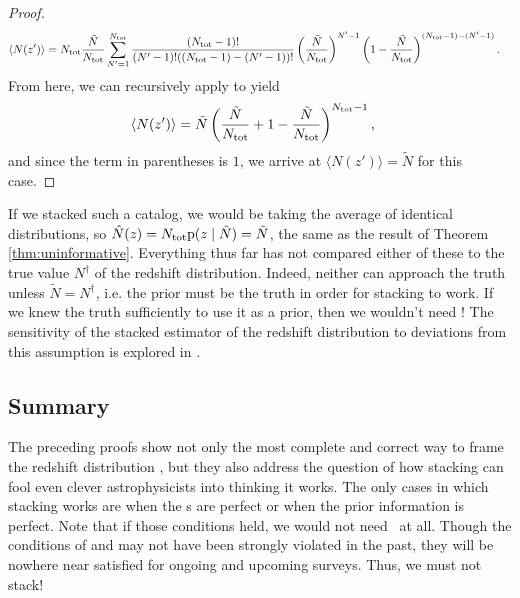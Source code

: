 \begin{proof}
	\begin{align}
	\eqlabel{eqn:proofwithprior5}
	\langle N(z') \rangle &= \ntot \frac{\tilde{N}}{\ntot} \sum_{N' = 1}^{\ntot} \frac{(\ntot - 1)!}{(N' - 1)! ((\ntot - 1) - (N' - 1))!} \left(\frac{\tilde{N}}{\ntot}\right)^{N' - 1} \left(1 - \frac{\tilde{N}}{\ntot}\right)^{(\ntot - 1) - (N' - 1)} .
	\end{align}
	From here, we can recursively apply  to yield
	\begin{align}
	\eqlabel{eqn:proofwithprior6}
	\langle N(z') \rangle &= \tilde{N} \left(\frac{\tilde{N}}{\ntot} + 1 - \frac{\tilde{N}}{\ntot}\right)^{\ntot - 1} ,
	\end{align}
	and since the term in parentheses is $1$, we arrive at $\langle N(z') \rangle = \tilde{N}$ for this case.
\end{proof}

If we stacked such a catalog, we would be taking the average of identical distributions, so $\hat{N}(z) = N_{\mathrm{tot}} \mathrm{p}(z \mid \tilde{N}) = \tilde{N}$, the same as the result of Theorem \ref{thm:uninformative}.
Everything thus far has not compared either of these to the true value $N^{\dagger}$ of the redshift distribution.
Indeed, neither can approach the truth unless $\tilde{N} = N^{\dagger}$, i.e. the prior must be the truth in order for stacking to work.
If we knew the truth sufficiently to use it as a prior, then we wouldn't need \lsst!
The sensitivity of the stacked estimator of the redshift distribution to deviations from this assumption is explored in .

\subsection{Summary}

The preceding proofs show not only the most complete and correct way to frame the redshift distribution \Nz, but they also address the question of how stacking can fool even clever astrophysicists into thinking it works.
The only cases in which stacking works are when the \pzpdf s are perfect or when the prior information is perfect.
Note that if those conditions held, we would not need \lsst\ at all.
Though the conditions of  and  may not have been strongly violated in the past, they will be nowhere near satisfied for ongoing and upcoming surveys.
Thus, we must not stack!

